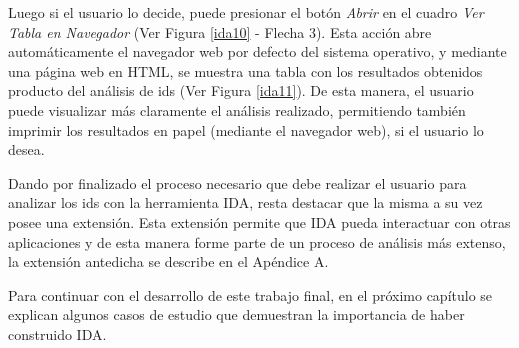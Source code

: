 Luego si el usuario lo decide, puede presionar el botón \textit{Abrir} en el cuadro \textit{Ver Tabla en Navegador} (Ver Figura \ref{ida10} - Flecha 3). Esta acción abre automáticamente el navegador web por defecto del sistema operativo, y mediante una página web en HTML, se muestra una tabla con los resultados obtenidos producto del análisis de ids (Ver Figura \ref{ida11}). De esta manera, el usuario puede visualizar más claramente el análisis realizado, permitiendo también imprimir los resultados en papel (mediante el navegador web), si el usuario lo desea.

Dando por finalizado el proceso necesario que debe realizar el usuario para analizar los ids con la herramienta IDA, resta destacar que la misma a su vez posee una extensión. Esta extensión permite que IDA pueda interactuar con otras aplicaciones y de esta manera forme parte de un proceso de análisis más extenso, la extensión antedicha se describe en el Apéndice A. 

Para continuar con el desarrollo de este trabajo final, en el próximo capítulo se explican algunos casos de estudio que demuestran la importancia de haber construido IDA.


